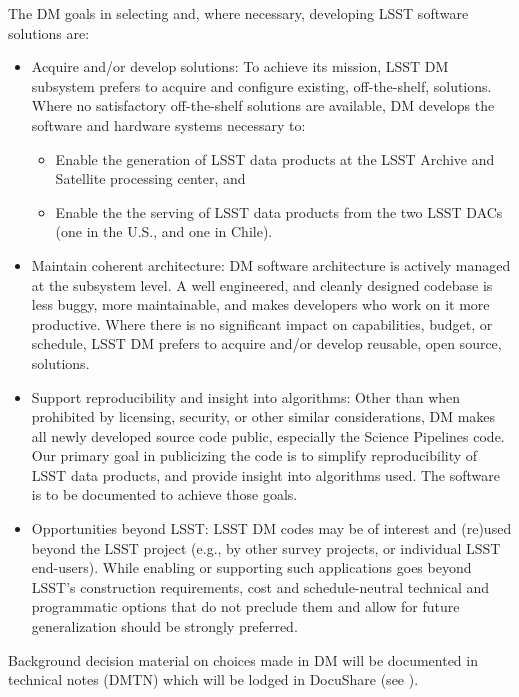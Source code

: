 The DM goals in selecting and, where necessary, developing LSST software solutions are:

\begin{itemize}
	\item Acquire and/or develop solutions: To achieve its mission, LSST DM subsystem prefers to acquire and configure existing, off-the-shelf, solutions. Where no satisfactory off-the-shelf solutions are available, DM develops the software and hardware systems necessary to:
\begin{itemize}
	\item Enable the generation of LSST data products at the LSST Archive and Satellite processing center, and
	\item Enable the the serving of LSST data products from the two LSST DACs (one in the U.S., and one in Chile).
\end{itemize}
	\item Maintain coherent architecture: DM software architecture is actively managed at the subsystem level. A well engineered, and cleanly designed codebase is less buggy, more maintainable, and makes developers who work on it more productive. Where there is no significant impact on capabilities, budget, or schedule, LSST DM prefers to acquire and/or develop reusable, open source, solutions.
	\item Support reproducibility and insight into algorithms: Other than when prohibited by licensing, security, or other similar considerations, DM makes all newly developed source code public, especially the Science Pipelines code. Our primary goal in publicizing the code is to simplify reproducibility of LSST data products, and provide insight into algorithms used. The software is to be documented to achieve those goals.
	\item Opportunities beyond LSST: LSST DM codes may be of interest and (re)used beyond the LSST project (e.g., by other survey projects, or individual LSST end-users). While enabling or supporting such applications goes beyond LSST’s construction requirements, cost and schedule-neutral technical and programmatic options that do not preclude them and allow for future generalization should be strongly preferred.


\end{itemize}

Background decision material on choices made in DM will be documented in technical notes (DMTN) which will be lodged in DocuShare (see ).
